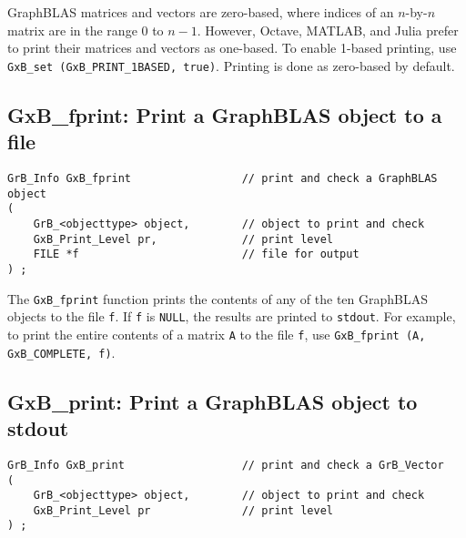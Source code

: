 \documentclass[12pt]{article}
\begin{document}
{GraphBLAS matrices and vectors are zero-based, where indices of an $n$-by-$n$
matrix are in the range 0 to $n-1$.  However, Octave, MATLAB, and Julia prefer
to print their matrices and vectors as one-based.  To enable 1-based printing,
use \verb'GxB_set (GxB_PRINT_1BASED, true)'.  Printing is done as zero-based by
default.

\newpage
\subsection{{\sf GxB\_fprint:} Print a GraphBLAS object to a file} %

\begin{mdframed}[userdefinedwidth=6in]
{\footnotesize
\begin{verbatim}
GrB_Info GxB_fprint                 // print and check a GraphBLAS object
(
    GrB_<objecttype> object,        // object to print and check
    GxB_Print_Level pr,             // print level
    FILE *f                         // file for output
) ;
\end{verbatim} } \end{mdframed}

The \verb'GxB_fprint' function prints the contents of any of the ten GraphBLAS
objects to the file \verb'f'.  If \verb'f' is \verb'NULL', the results are
printed to \verb'stdout'.  For example, to print the entire contents of a
matrix \verb'A' to the file \verb'f', use
\verb'GxB_fprint (A, GxB_COMPLETE, f)'.

\subsection{{\sf GxB\_print:} Print a GraphBLAS object to {\sf stdout}} %
\label{gxb_print}

\begin{mdframed}[userdefinedwidth=6in]
{\footnotesize
\begin{verbatim}
GrB_Info GxB_print                  // print and check a GrB_Vector
(
    GrB_<objecttype> object,        // object to print and check
    GxB_Print_Level pr              // print level
) ;
\end{verbatim} } \end{mdframed}

}
\end{document}
